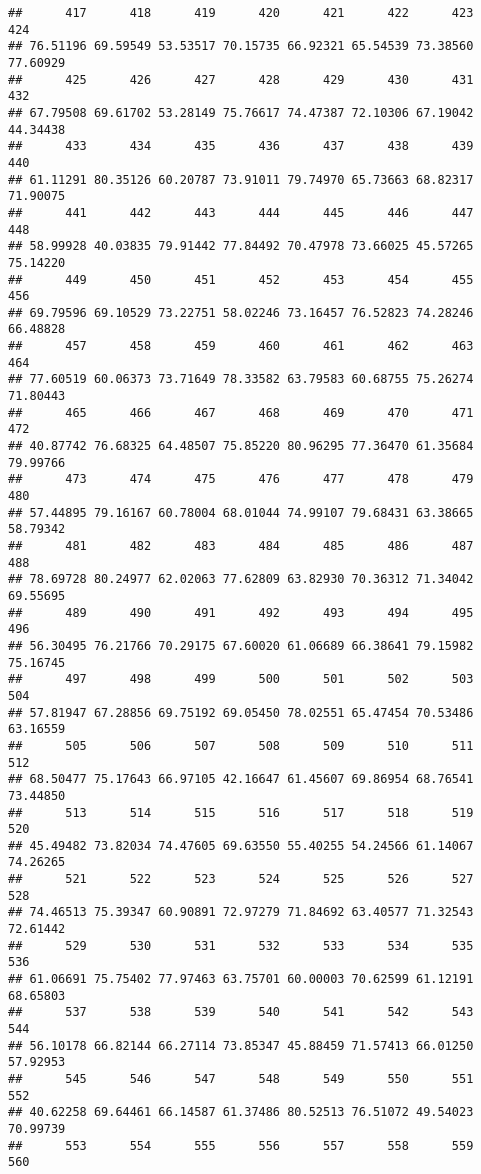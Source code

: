 \documentclass[
]{article}
\begin{document}
\begin{verbatim}
##      417      418      419      420      421      422      423      424 
## 76.51196 69.59549 53.53517 70.15735 66.92321 65.54539 73.38560 77.60929 
##      425      426      427      428      429      430      431      432 
## 67.79508 69.61702 53.28149 75.76617 74.47387 72.10306 67.19042 44.34438 
##      433      434      435      436      437      438      439      440 
## 61.11291 80.35126 60.20787 73.91011 79.74970 65.73663 68.82317 71.90075 
##      441      442      443      444      445      446      447      448 
## 58.99928 40.03835 79.91442 77.84492 70.47978 73.66025 45.57265 75.14220 
##      449      450      451      452      453      454      455      456 
## 69.79596 69.10529 73.22751 58.02246 73.16457 76.52823 74.28246 66.48828 
##      457      458      459      460      461      462      463      464 
## 77.60519 60.06373 73.71649 78.33582 63.79583 60.68755 75.26274 71.80443 
##      465      466      467      468      469      470      471      472 
## 40.87742 76.68325 64.48507 75.85220 80.96295 77.36470 61.35684 79.99766 
##      473      474      475      476      477      478      479      480 
## 57.44895 79.16167 60.78004 68.01044 74.99107 79.68431 63.38665 58.79342 
##      481      482      483      484      485      486      487      488 
## 78.69728 80.24977 62.02063 77.62809 63.82930 70.36312 71.34042 69.55695 
##      489      490      491      492      493      494      495      496 
## 56.30495 76.21766 70.29175 67.60020 61.06689 66.38641 79.15982 75.16745 
##      497      498      499      500      501      502      503      504 
## 57.81947 67.28856 69.75192 69.05450 78.02551 65.47454 70.53486 63.16559 
##      505      506      507      508      509      510      511      512 
## 68.50477 75.17643 66.97105 42.16647 61.45607 69.86954 68.76541 73.44850 
##      513      514      515      516      517      518      519      520 
## 45.49482 73.82034 74.47605 69.63550 55.40255 54.24566 61.14067 74.26265 
##      521      522      523      524      525      526      527      528 
## 74.46513 75.39347 60.90891 72.97279 71.84692 63.40577 71.32543 72.61442 
##      529      530      531      532      533      534      535      536 
## 61.06691 75.75402 77.97463 63.75701 60.00003 70.62599 61.12191 68.65803 
##      537      538      539      540      541      542      543      544 
## 56.10178 66.82144 66.27114 73.85347 45.88459 71.57413 66.01250 57.92953 
##      545      546      547      548      549      550      551      552 
## 40.62258 69.64461 66.14587 61.37486 80.52513 76.51072 49.54023 70.99739 
##      553      554      555      556      557      558      559      560 

\end{verbatim}
\end{document}
